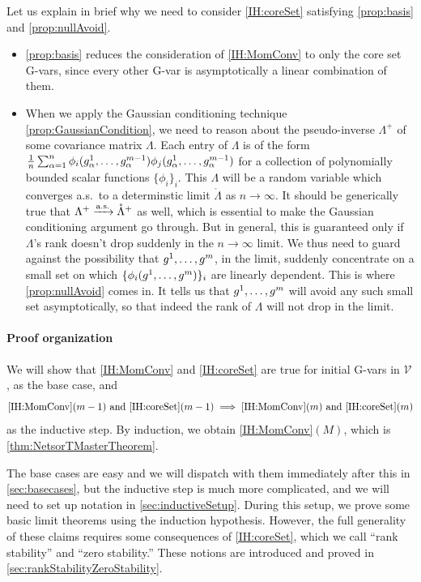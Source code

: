 \documentclass[main.tex]{subfiles}
\begin{document}
Let us explain in brief why we need to consider \ref{IH:coreSet} satisfying \ref{prop:basis} and \ref{prop:nullAvoid}.
\begin{itemize}
\item
    \ref{prop:basis} reduces the consideration of \ref{IH:MomConv} to only the core set G-vars, since every other G-var is asymptotically a linear combination of them.
\item
    When we apply the Gaussian conditioning technique \cref{prop:GaussianCondition}, we need to reason about the pseudo-inverse $\Lambda^+$ of some covariance matrix $\Lambda$.
    Each entry of $\Lambda$ is of the form $\frac{1}{n} \sum_{\alpha=1}^n \phi_i(g^1_\alpha, \ldots, g^{m-1}_\alpha) \phi_j(g^1_\alpha, \ldots, g^{m-1}_\alpha)$ for a collection of polynomially bounded scalar functions $\{\phi_i\}_i$.
    This $\Lambda$ will be a random variable which converges a.s.\ to a determinstic limit $\mathring \Lambda$  as $n \to \infty$.
    It should be generically true that $\Lambda^+ \xrightarrow{\mathrm{a.s.}} \mathring \Lambda^+$ as well, which is essential to make the Gaussian conditioning argument go through.
    But in general, this is guaranteed only if $\Lambda$'s rank doesn't drop suddenly in the $n \to \infty$ limit.
    We thus need to guard against the possibility that $g^1, \ldots, g^m$, in the limit, suddenly concentrate on a small set on which $\{\phi_i(g^1, \ldots, g^m)\}_i$ are linearly dependent.
    This is where \ref{prop:nullAvoid} comes in.
    It tells us that $g^1, \ldots, g^m$ will avoid any such small set asymptotically, so that indeed the rank of $\Lambda$ will not drop in the limit.
\end{itemize}

\paragraph{Proof organization}

We will show that \ref{IH:MomConv} and \ref{IH:coreSet} are true for initial G-vars in $\mathcal V$, as the base case, and
\begin{equation*}
\text{\ref{IH:MomConv}}(m-1) \text{ and } \text{\ref{IH:coreSet}}(m-1) \implies \text{\ref{IH:MomConv}}(m) \text{ and } \text{\ref{IH:coreSet}}(m)
\end{equation*}
as the inductive step.
By induction, we obtain \ref{IH:MomConv}$(M)$, which is \cref{thm:NetsorTMasterTheorem}.

The base cases are easy and we will dispatch with them immediately after this in \cref{sec:basecases}, but the inductive step is much more complicated, and we will need to set up notation in \cref{sec:inductiveSetup}.
During this setup, we prove some basic limit theorems using the induction hypothesis.
However, the full generality of these claims requires some consequences of \ref{IH:coreSet}, which we call ``rank stability'' and ``zero stability.''
These notions are introduced and proved in \cref{sec:rankStabilityZeroStability}.
\end{document}
